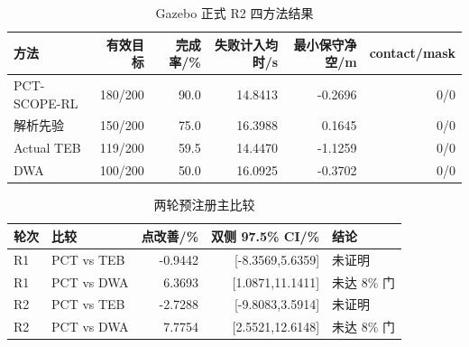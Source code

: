 \begin{table}[htbp]
\centering
\caption{Gazebo 正式 R2 四方法结果}
\begin{tabular}{lrrrrr}
\toprule
方法 & 有效目标 & 完成率/\% & 失败计入均时/s & 最小保守净空/m & contact/mask\\
\midrule
PCT-SCOPE-RL & 180/200 & 90.0 & 14.8413 & -0.2696 & 0/0\\
解析先验 & 150/200 & 75.0 & 16.3988 & 0.1645 & 0/0\\
Actual TEB & 119/200 & 59.5 & 14.4470 & -1.1259 & 0/0\\
DWA & 100/200 & 50.0 & 16.0925 & -0.3702 & 0/0\\
\bottomrule
\end{tabular}
\end{table}

\begin{table}[htbp]
\centering
\caption{两轮预注册主比较}
\begin{tabular}{llrrl}
\toprule
轮次 & 比较 & 点改善/\% & 双侧 97.5\% CI/\% & 结论\\
\midrule
R1 & PCT vs TEB & -0.9442 & [-8.3569,5.6359] & 未证明\\
R1 & PCT vs DWA & 6.3693 & [1.0871,11.1411] & 未达 8\% 门\\
R2 & PCT vs TEB & -2.7288 & [-9.8083,3.5914] & 未证明\\
R2 & PCT vs DWA & 7.7754 & [2.5521,12.6148] & 未达 8\% 门\\
\bottomrule
\end{tabular}
\end{table}
